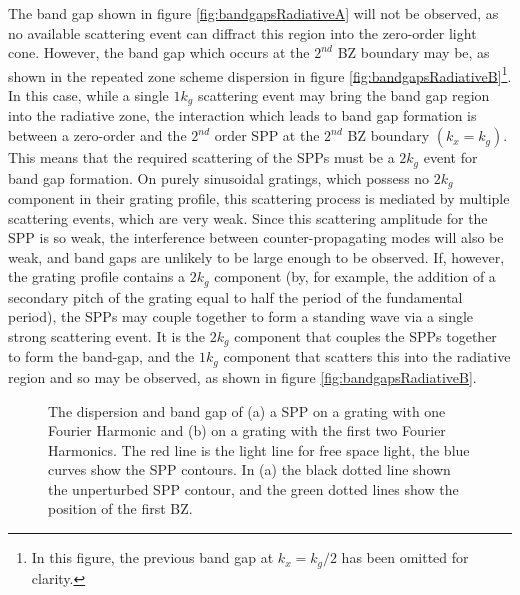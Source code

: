 The band gap shown in figure \ref{fig:bandgapsRadiativeA} will not be observed, as no available scattering event can diffract this region into the zero-order light cone. However, the band gap which occurs at the $2^{nd}$ BZ boundary may be, as shown in the repeated zone scheme dispersion in figure \ref{fig:bandgapsRadiativeB}\footnote{In this figure, the previous band gap at $k_x=k_g/2$ has been omitted for clarity.}. In this case, while a single $1k_g$ scattering event may bring the band gap region into the radiative zone, the interaction which leads to band gap formation is between a zero-order and the $2^{nd}$ order SPP at the $2^{nd}$ BZ boundary $(k_x=k_g)$. This means that the required scattering of the SPPs must be a $2k_g$ event for band gap formation. On purely sinusoidal gratings, which possess no  $2k_g$ component in their grating profile, this scattering process is mediated by multiple scattering events, which are very weak. Since this scattering amplitude for the SPP is so weak, the interference between counter-propagating modes will also be weak, and band gaps are unlikely to be large enough to be observed. If, however, the grating profile contains a $2k_g$ component (by, for example, the addition of a secondary pitch of the grating equal to half the period of the fundamental period), the SPPs may couple together to form a standing wave via a single strong scattering event. It is the $2k_g$ component that couples the SPPs together to form the band-gap, and the $1k_g$ component that scatters this into the radiative region and so may be observed, as shown in figure \ref{fig:bandgapsRadiativeB}.

\begin{figure}
\begin{center}
\end{center}
\caption[The dispersions and band gaps of a SPP on a grating with one Fourier Harmonic and on a grating with the first two Fourier Harmonics.]{The dispersion and band gap of (a) a SPP on a grating with one Fourier Harmonic and (b) on a grating with the first two Fourier Harmonics. The red line is the light line for free space light, the blue curves show the SPP contours. In (a) the black dotted line shown the unperturbed SPP contour, and the green dotted lines show the position of the first BZ.\label{fig:bandgapsRadiative}}
\end{figure}

